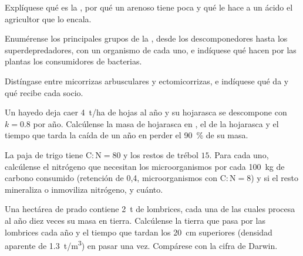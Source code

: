 \begin{exercise}[$\star$]\label{exo:b2:living-soil:2}
Explíquese qué es la , por qué un 
arenoso tiene poca y qué le hace a un  ácido el agricultor que lo
encala.
\end{exercise}

\begin{exercise}[$\star$]\label{exo:b2:living-soil:3}
Enumérense los principales grupos de la , desde los
descomponedores hasta los superdepredadores, con un organismo de cada uno,
e indíquese qué hacen por las plantas los consumidores de bacterias.
\end{exercise}

\begin{exercise}[$\star$]\label{exo:b2:living-soil:4}
Distíngase entre micorrizas arbusculares y ectomicorrizas, e indíquese qué
da y qué recibe cada socio.
\end{exercise}

\begin{exercise}[$\star\star$]\label{exo:b2:living-soil:5}
Un hayedo deja caer \qty{4}{t/ha} de hojas al año y su hojarasca se
descompone con $k = 0.8$ por año. Calcúlense la masa de hojarasca en
, el  de la hojarasca y el tiempo
que tarda la caída de un año en perder el \qty{90}{\%} de su masa.
\end{exercise}

\begin{exercise}[$\star\star$]\label{exo:b2:living-soil:6}
La paja de trigo tiene $\mathrm{C:N} = 80$ y los restos de trébol $15$. Para
cada uno, calcúlense el nitrógeno que necesitan los microorganismos por
cada \qty{100}{kg} de carbono consumido (retención de 0,4, microorganismos con
$\mathrm{C:N} = 8$) y si el resto mineraliza o inmoviliza nitrógeno, y
cuánto.
\end{exercise}

\begin{exercise}[$\star\star$]\label{exo:b2:living-soil:7}
Una hectárea de prado contiene \qty{2}{t} de lombrices, cada una de las
cuales procesa al año diez veces su masa en tierra. Calcúlense la tierra
que pasa por las lombrices cada año y el tiempo que tardan los
\qty{20}{cm} superiores (densidad aparente de \qty{1.3}{t/m^3}) en pasar
una vez. Compárese con la cifra de Darwin.
\end{exercise}

